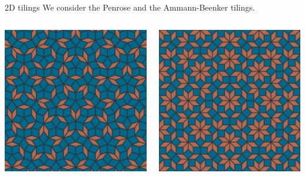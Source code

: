 \documentclass[xcolor=x11names,compress,professionalfonts, aspectratio=169]{beamer}
\renewcommand{\(}{\begin{columns}}
\renewcommand{\)}{\end{columns}}
\newcommand{\<}[1]{\begin{column}{#1}}
\renewcommand{\>}{\end{column}}
\begin{document}
\begin{frame}{2D tilings}
We consider the Penrose and the Ammann-Beenker tilings.
\begin{columns}
\begin{column}{5cm}
{\centering
\includegraphics[scale=.09]{img/penrose.png}

}
\end{column}
\begin{column}{5cm}
{\centering
\includegraphics[scale=.09]{img/ammann-beenker.png}

}
\end{column}
\end{columns}
\end{frame}
\end{document}
